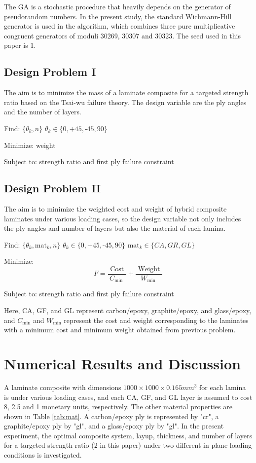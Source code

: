 \documentclass[Afour,sagev,times]{sagej}
\begin{document}
The GA is a stochastic procedure that heavily depends on the generator of pseudorandom numbers. In
the present study, the standard Wichmann-Hill generator is used in the algorithm, which combines
three pure multiplicative congruent generators of moduli 30269, 30307 and 30323. The seed used
in this paper is 1.

\subsection{Design Problem I}

The aim is to minimize the mass of a laminate composite for a targeted strength
ratio based on the Tsai-wu failure theory. The design variable are the ply angles and the
number of layers.

Find: $\{\theta_k, n\}$ $\theta_k \in \{ 0,\text{+}45,\text{-}45,90\}$

Minimize: weight

Subject to: strength ratio and first ply failure constraint


\subsection{Design Problem II}
The aim is to minimize the weighted cost and weight of hybrid composite
laminates under various loading cases, so the design variable not only includes
the ply angles and number of layers but also the material of each lamina.


Find: $\{\theta_k,\text{mat}_k, n\}$ $\theta_k \in \{ 0,\text{+}45,\text{-}45,90\}$ $\text{mat}_k \in \{CA, GR, GL \}$

Minimize:
\begin{equation}
	F=\frac{\text { Cost }}{C_{\text {min }}}+\frac{\text { Weight }}{W_{\text {min }}}
\end{equation}

Subject to: strength ratio and first ply failure constraint


Here, CA, GF, and GL represent carbon/epoxy, graphite/epoxy, and glass/epoxy, and
$C_{\text{min}}$ and $W_{\text{min}}$ represent the cost and
weight corresponding to the laminates with a minimum cost and minimum weight
obtained from previous problem.

\section{Numerical Results and Discussion}
A laminate composite with dimensions $1000 \times 1000 \times 0.165 mm^3$ for
each lamina is under various loading cases, and each CA, GF, and GL layer is
assumed to cost 8, 2.5 and 1 monetary units, respectively. The other
material properties are shown in Table \ref{tab:mat}. A carbon/epoxy ply is represented by "cr", a
graphite/epoxy ply by "gl", and a glass/epoxy ply by "gl".  In the present
experiment, the optimal composite system, layup, thickness, and number of
layers for a targeted strength ratio (2 in this paper) under two different
in-plane loading conditions is investigated.
\end{document}
